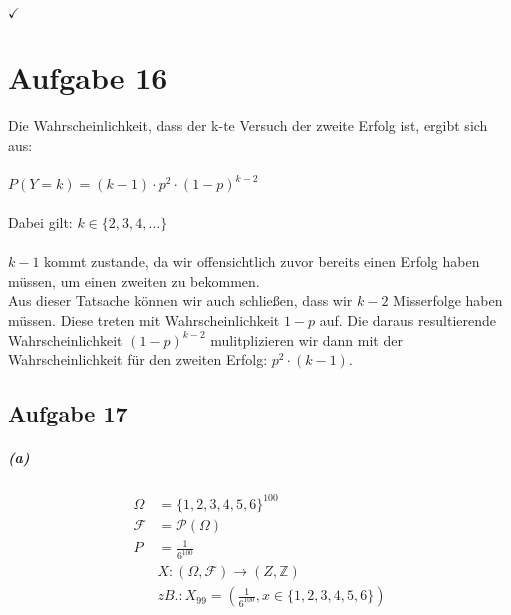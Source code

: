 \documentclass[a4paper]{scrartcl}
\begin{document}
$\checkmark$

\section*{Aufgabe 16}
Die Wahrscheinlichkeit, dass der k-te Versuch der zweite Erfolg ist, ergibt sich aus:\\
\\
$P(Y=k) = (k-1) \cdot p^2 \cdot (1-p)^{k-2}$\\\\
Dabei gilt: $k \in \lbrace 2,3,4,... \rbrace$\\
\\
$k-1$ kommt zustande, da wir offensichtlich zuvor bereits einen Erfolg haben müssen, um einen zweiten zu bekommen.\\
Aus dieser Tatsache können wir auch schließen, dass wir $k-2$ Misserfolge haben müssen. Diese treten mit Wahrscheinlichkeit $1-p$ auf. Die daraus resultierende Wahrscheinlichkeit $(1-p)^{k-2}$ mulitplizieren wir dann mit der Wahrscheinlichkeit für den zweiten Erfolg: $p^2 \cdot (k-1)$.




\subsection*{Aufgabe 17}
\subparagraph*{(a)}
\begin{align*}
	\Omega &= \lbrace 1,2,3,4,5,6 \rbrace^{100}\\
	\mathcal{F} &= \mathcal{P}(\Omega)\\
	P &= \frac{1}{6^{100}}\\
	&X:(\Omega, \mathcal{F}) \rightarrow (Z, \mathbb{Z})\\
	&zB.: X_{99} = (\frac{1}{6^{100}}, x \in \lbrace 1,2,3,4,5,6 \rbrace)	
\end{align*}
\end{document}

